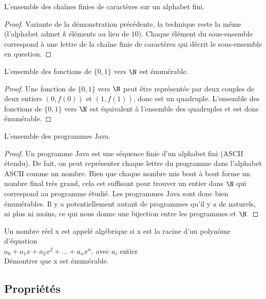\begin{myexem}
\label{exem:chaines_finies}
  L'ensemble des chaînes finies de caractères sur un alphabet fini.
\begin{proof}
 Variante de la démonstration précédente, la technique reste la même (l'alphabet admet $k$ éléments au lieu de $10$). Chaque élément du sous-ensemble correspond à une lettre de la chaîne finie de caractères qui décrit le sous-ensemble en question.
\end{proof}
\end{myexem}

\begin{myexem}
 L'ensemble des fonctions de  $\{0, 1\}$ vers $\N$ est énumérable.
 \begin{proof}
  Une fonction de $\{0, 1\}$ vers $\N$ peut être représentée par deux couples de deux entiers $(0, f(0))$ et $(1, f(1))$, donc est un quadruple. L'ensemble des fonctions de $\{0, 1\}$ vers $\N$ est équivalent à l'ensemble des quadruples et est donc énumérable.
 \end{proof}
\end{myexem}

 \begin{myexem}
 \label{exem:programme_java}
  L'ensemble des programmes Java.
  \begin{proof}
   Un programme Java est une séquence finie d'un alphabet fini (ASCII étendu). De fait, on peut représenter chaque lettre du programme dans l'alphabet ASCII comme un nombre. Bien que chaque nombre mis bout à bout forme un nombre final très grand, cela est suffisant pour trouver un entier dans $\N$ qui correspond au programme étudié. Les programmes Java sont donc bien énumérables. Il y a potentiellement autant de programmes qu'il y a de naturels, ni plus ni moins, ce qui nous donne une bijection entre les programmes et $\N$.
  \end{proof}
\end{myexem}

\begin{myexercice} \label{exerc:ensembleEnumNumAlgebrique}
Un nombre réel x est appelé algébrique si x est la racine d'un polynôme d'équation\\
\indent $a_0 + a_1x + a_2x^2 + ... + a_nx^n$.  avec $a_i$ entier\\
Démontrer que x est énumérable.
\end{myexercice}

\subsection{Propriétés}
\label{subsec:proprietes}

